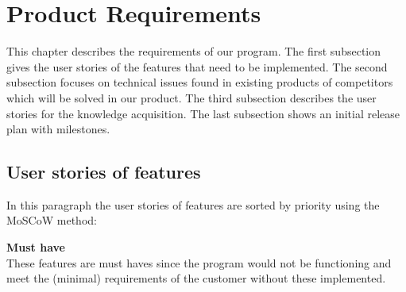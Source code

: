 \section{Product Requirements}

This chapter describes the requirements of our program. The first subsection gives the user stories of the features that need to be implemented. The second subsection focuses on technical issues found in existing products of competitors which will be solved in our product. The third subsection describes the user stories for the knowledge acquisition. The last subsection shows an initial release plan with milestones. 

\subsection{User stories of features}
In this paragraph the user stories of features are sorted by priority using the MoSCoW method:

\textbf{Must have} \\ 
These features are must haves since the program would not be functioning and meet the (minimal) requirements of the customer without these implemented. 


